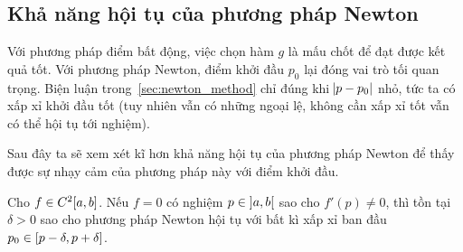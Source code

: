 \documentclass[../../Lectures.tex]{subfiles}
\begin{document}
\subsection{Khả năng hội tụ của phương pháp Newton}

Với phương pháp điểm bất động, việc chọn hàm \(g\) là mấu chốt để đạt được kết
quả tốt. Với phương pháp Newton, điểm khởi đầu \(p_0\) lại đóng vai trò tối quan
trọng. Biện luận trong~\ref{sec:newton_method} chỉ đúng khi \(\abs{p - p_0}\)
nhỏ, tức ta có xấp xỉ khởi đầu tốt (tuy nhiên vẫn có những ngoại lệ, không cần
xấp xỉ tốt vẫn có thể hội tụ tới nghiệm).

Sau đây ta sẽ xem xét kĩ hơn khả năng hội tụ của phương pháp Newton để thấy được
sự nhạy cảm của phương pháp này với điểm khởi đầu.

\begin{theorem}
    Cho \(f \in C^2 \interval{a}{b}\). Nếu \(f = 0\) có nghiệm \(p \in
    \interval[open]{a}{b}\) sao cho \(f'(p) \neq 0\), thì tồn tại \(\delta > 0\)
    sao cho phương pháp Newton hội tụ với bất kì xấp xỉ ban đầu \(p_0 \in
    \interval{p - \delta}{p + \delta}\).
\end{theorem}
\end{document}
